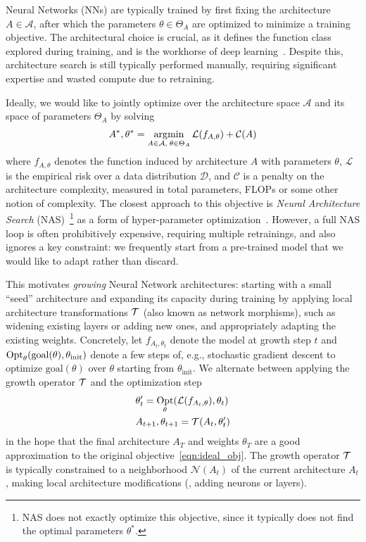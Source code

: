 Neural Networks (NNs) are typically trained by first fixing the architecture $A \in \mathcal{A}$, after which the parameters $\theta \in \Theta_A$ are optimized to minimize a training objective. The architectural choice is crucial, as it defines the function class explored during training, 
and is the workhorse of deep learning~\citep{he_deep_2016,vaswani_attention_2017}. Despite this, architecture search is still typically performed manually, requiring significant expertise and wasted compute due to retraining.

Ideally, we would like to jointly optimize over the architecture space $\mathcal{A}$ and its space of parameters $\Theta_A$ by solving
\begin{align}\label{eqn:ideal_obj}
    A^*, \theta^* = \operatorname*{\arg\!\min}_{A\in \mathcal{A},\; \theta \in  \Theta_A}  \mathcal{L}(f_{A,\theta}) + \mathcal{C}(A)
\end{align}
where $f_{A,\theta}$ denotes the function induced by architecture $A$ with parameters $\theta$, $\mathcal{L}$ is the empirical risk over a data distribution $\mathcal{D}$, and $\mathcal{C}$ is a penalty on the architecture complexity, measured in total parameters, FLOPs or some other notion of complexity. The closest approach to this objective is \emph{Neural Architecture Search} (NAS)~\citep{zoph_neural_2017}\footnote{NAS does not exactly optimize this objective, since it typically does not find the optimal parameters $\theta^*$.}
as a form of hyper-parameter optimization~\citep{egele:tel-04636586}. However, a full NAS loop is often prohibitively expensive, requiring multiple retrainings, and also ignores a key constraint: we frequently start from a pre-trained model that we would like to adapt rather than discard.

This motivates \emph{growing} Neural Network architectures: starting with a small ``seed'' architecture and expanding its capacity during training by applying local architecture transformations $\mathcal{T}$ (also known as network morphisms), such as widening existing layers or adding new ones, and appropriately adapting the existing weights. Concretely, let $f_{A_t, \theta_t}$ denote the model at growth step $t$ and $\operatorname*{\text{Opt}}_
\theta(\textrm{goal}(\theta), \theta_{\text{init}})$ denote a few steps of, e.g., stochastic gradient descent to optimize $\text{goal}(\theta)$ over $\theta$ starting from $\theta_{\text{init}}$.
We alternate between applying the growth operator $\mathcal{T}$ and the optimization step
\begin{equation}\label{eqn:grow_decomposition}
\begin{aligned}
    &\theta_t' = \operatorname*{\text{Opt}}_{\theta}(\mathcal{L}(f_{A_t, \theta}), \theta_t )\\
    &A_{t+1}, \theta_{t+1} = \mathcal{T}(A_t, \theta_{t}') 
\end{aligned}
\end{equation}
in the hope that the final architecture $A_T$ and weights $\theta_T$ are a good approximation to the original objective~\eqref{eqn:ideal_obj}. The growth operator $\mathcal{T}$ is typically constrained to a neighborhood $\mathcal{N}(A_t)$ of the current architecture $A_t$, making local architecture modifications (\eg{}, adding neurons or layers).

